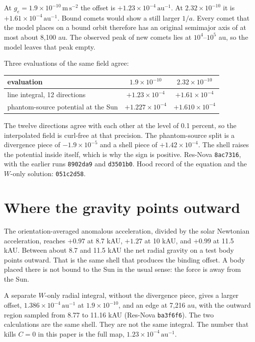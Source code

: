 \documentclass[11pt]{article}
\begin{document}
At \(g_e = 1.9\times 10^{-10}\,\mathrm{m\,s^{-2}}\) the offset is \(+1.23\times 10^{-4}\,\mathrm{au^{-1}}\). At \(2.32\times 10^{-10}\) it is \(+1.61\times 10^{-4}\,\mathrm{au^{-1}}\). Bound comets would show a still larger \(1/a\). Every comet that the model places on a bound orbit therefore has an original semimajor axis of at most about 8{,}100 au. The observed peak of new comets lies at \(10^{4}\)--\(10^{5}\) au, so the model leaves that peak empty.

Three evaluations of the same field agree:
\begin{center}
\begin{tabular}{lcc}
\hline
evaluation & \(1.9\times 10^{-10}\) & \(2.32\times 10^{-10}\) \\
\hline
line integral, 12 directions & \(+1.23\times 10^{-4}\) & \(+1.61\times 10^{-4}\) \\
phantom-source potential at the Sun & \(+1.227\times 10^{-4}\) & \(+1.610\times 10^{-4}\) \\
\hline
\end{tabular}
\end{center}
The twelve directions agree with each other at the level of 0.1 percent, so the interpolated field is curl-free at that precision. The phantom-source split is a divergence piece of \(-1.9\times 10^{-5}\) and a shell piece of \(+1.42\times 10^{-4}\). The shell raises the potential inside itself, which is why the sign is positive. Res-Nova \texttt{8ac7316}, with the earlier runs \texttt{8902da9} and \texttt{d3501b0}. Hood record of the equation and the \(W\)-only solution: \texttt{051c2d58}.

\section{Where the gravity points outward}

The orientation-averaged anomalous acceleration, divided by the solar Newtonian acceleration, reaches \(+0.97\) at 8.7 kAU, \(+1.27\) at 10 kAU, and \(+0.99\) at 11.5 kAU. Between about 8.7 and 11.5 kAU the net radial gravity on a test body points outward. That is the same shell that produces the binding offset. A body placed there is not bound to the Sun in the usual sense: the force is away from the Sun.

A separate \(W\)-only radial integral, without the divergence piece, gives a larger offset, \(1.386\times 10^{-4}\,\mathrm{au^{-1}}\) at \(1.9\times 10^{-10}\), and an edge at 7{,}216 au, with the outward region sampled from 8.77 to 11.16 kAU (Res-Nova \texttt{ba3f6f6}). The two calculations are the same shell. They are not the same integral. The number that kills \(C = 0\) in this paper is the full map, \(1.23\times 10^{-4}\,\mathrm{au^{-1}}\).
\end{document}
